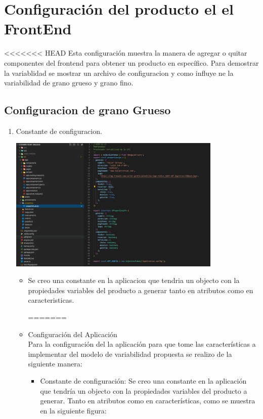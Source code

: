 \documentclass[10pt,a4paper,openany]{book}
\begin{document}
\section{Configuración del producto el el FrontEnd}

<<<<<<< HEAD
Esta configuración muestra la manera de agregar o quitar componentes del frontend para obtener un producto en específico. Para demostrar la variablidad se mostrar un archivo de configuracion y como influye ne la variabilidad de grano grueso y grano fino.

\subsection{Configuracion de grano Grueso}

\begin{enumerate}

\item Constante de configuracion.\\
\begin{center}
\includegraphics[width=0.8\textwidth]{oc_4}
\end{center}
\begin{itemize}

\item Se creo una constante en la aplicacion que tendria un objecto con la propiedades variables del producto a generar tanto en atributos como en caracteristicas.

=======
\item Configuración del Aplicación \\
Para la configuración del la aplicación para que tome las características a implementar del modelo de variabilidad propuesta se realizo de la siguiente manera: 
\begin{itemize}
\item Constante de configuración: Se creo una constante en la aplicación que tendría un objecto con la propiedades variables del producto a generar. Tanto en atributos como en características, como se muestra en la siguiente figura:


\end{itemize}
\end{itemize}
\end{enumerate}
\end{document}
